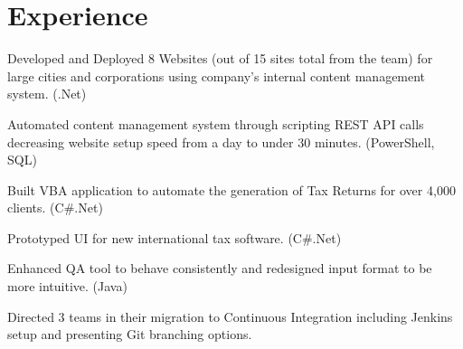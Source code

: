 \documentclass[letterpaper]{kevin-resume} %
\begin{document}
\begin{minipage}[t]{0.66\textwidth} %


\section{Experience}

\vspace{\topsep} %
\begin{tightitemize}
	\item Developed and Deployed 8 Websites (out of 15 sites total from the team) for large cities and corporations using company's internal content management system. (.Net)
 	\item Automated content management system through scripting REST API calls decreasing website setup speed from a day to under 30 minutes. (PowerShell, SQL)
\end{tightitemize}

\sectionspace %


\begin{tightitemize}
	\item Built VBA application to automate the generation of Tax Returns for over 4,000 clients. (C\#.Net)
	\item Prototyped UI for new international tax software. (C\#.Net)
\end{tightitemize}

\sectionspace %


\begin{tightitemize}
	\item Enhanced QA tool to behave consistently and redesigned input format to be more intuitive. (Java)
	\item Directed 3 teams in their migration to Continuous Integration including Jenkins setup and presenting Git branching options.
\end{tightitemize}


\end{minipage}
\end{document}
